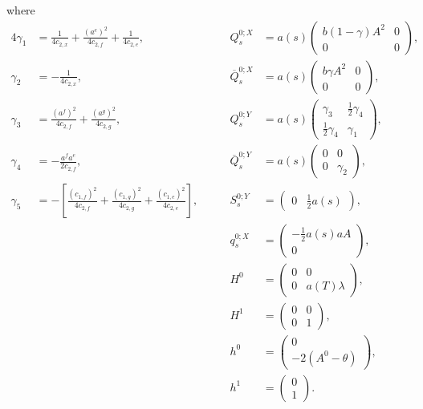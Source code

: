 \documentclass[10pt,a4paper]{amsart}
\numberwithin{equation}{section}
\renewcommand{\bar}{\overline}
\begin{document}
where 
\begin{alignat*}{4}
    \gamma_1 &= \frac{1}{4c_{2,x}} + \frac{(a^e)^2}{4c_{2,f}} + \frac{1}{4c_{2,e}}, \qquad&
    Q^{0;X}_s &= a(s) \begin{pmatrix} b(1-\gamma)A^2 & 0 \\ 0 & 0 \end{pmatrix}, \\[6pt]
    \gamma_2 &= -\frac{1}{4c_{2,x}}, \qquad&
    \bar{Q}^{0;X}_s &= a(s) \begin{pmatrix} b\gamma A^2 & 0 \\ 0 & 0 \end{pmatrix}, \\[6pt]
    \gamma_3 &= \frac{(a^f)^2}{4c_{2,f}} + \frac{(a^g)^2}{4c_{2,g}}, \qquad&
    Q^{0;Y}_s &= a(s) \begin{pmatrix} \gamma_3 & \frac{1}{2}\gamma_4 \\ \frac{1}{2}\gamma_4 & \gamma_1 \end{pmatrix}, \\[6pt]
    \gamma_4 &= -\frac{a^f a^e}{2c_{2,f}}, \qquad&
    \bar{Q}^{0;Y}_s &= a(s) \begin{pmatrix} 0 & 0 \\ 0 & \gamma_2 \end{pmatrix}, \\[6pt]
    \gamma_5 &= -\left[ \frac{(c_{1,f})^2}{4c_{2,f}} + \frac{(c_{1,g})^2}{4c_{2,g}} + \frac{(c_{1,e})^2}{4c_{2,e}} \right], \qquad&
    S^{0;Y}_s &= \begin{pmatrix} 0 & \frac{1}{2}a(s) \end{pmatrix}, \\[6pt]
    & &
    q^{0;X}_s &= \begin{pmatrix} -\frac{1}{2}a(s)aA \\ 0 \end{pmatrix}, \\[6pt]
    & &
    H^0 &= \begin{pmatrix} 0 & 0 \\ 0 & a(T)\lambda \end{pmatrix}, \\[6pt]
    & &
    H^1 &= \begin{pmatrix} 0 & 0 \\ 0 & 1 \end{pmatrix}, \\[6pt]
    & &
    h^0 &= \begin{pmatrix} 0 \\ -2(A^0 - \theta) \end{pmatrix}, \\[6pt]
    & &
    h^1 &= \begin{pmatrix} 0 \\ 1 \end{pmatrix}.
\end{alignat*}
\end{document}
